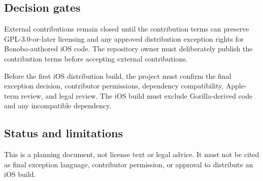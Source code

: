 \documentclass[
]{article}
\begin{document}
\subsection{Decision gates}\label{decision-gates}

External contributions remain closed until the contribution terms can
preserve GPL-3.0-or-later licensing and any approved distribution
exception rights for Bonobo-authored iOS code. The repository owner must
deliberately publish the contribution terms before accepting external
contributions.

Before the first iOS distribution build, the project must confirm the
final exception decision, contributor permissions, dependency
compatibility, Apple-term review, and legal review. The iOS build must
exclude Gorilla-derived code and any incompatible dependency.

\subsection{Status and limitations}\label{status-and-limitations}

This is a planning document, not license text or legal advice. It must
not be cited as final exception language, contributor permission, or
approval to distribute an iOS build.
\end{document}

